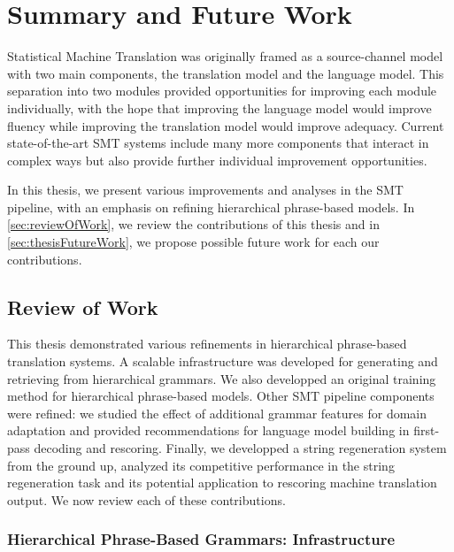 \chapter{Summary and Future Work}


Statistical Machine Translation was originally framed as a source-channel
model with two main components, the translation model and the
language model. This separation into two modules provided opportunities
for improving each module individually, with the hope that improving the language model
would improve fluency while improving the translation model would improve
adequacy. Current state-of-the-art SMT systems include many more components
that interact in complex ways but also provide further individual improvement
opportunities.

In this thesis, we present various improvements and analyses in the
SMT pipeline, with an emphasis on refining hierarchical phrase-based
models. In \autoref{sec:reviewOfWork}, we review the contributions of
this thesis and in \autoref{sec:thesisFutureWork}, we propose
possible future work for each our contributions.

\section{Review of Work}
\label{sec:reviewOfWork}

This thesis demonstrated various refinements in
hierarchical phrase-based translation systems.
A scalable infrastructure was developed for generating
and retrieving from hierarchical grammars. We also
developped an original training method for hierarchical
phrase-based models. Other SMT pipeline components
were refined: we studied the effect of additional
grammar features for domain adaptation and provided recommendations
for language model building in first-pass decoding and rescoring.
Finally, we developped a string regeneration system from the
ground up, analyzed its competitive performance in
the string regeneration task and its potential application to
rescoring machine translation output. We now review each of
these contributions.

\subsection{Hierarchical Phrase-Based Grammars: Infrastructure}

